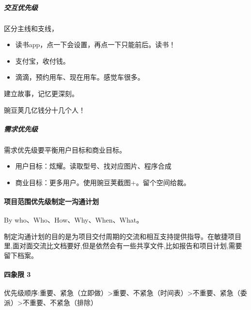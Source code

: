 \documentclass[letterpaper,11pt,english]{sphinxmanual}
\begin{document}
\subparagraph{交互优先级}
\label{\detokenize{chapter_skill/priority:id6}}
区分主线和支线，
\begin{itemize}
\item {} 
读书app，点一下会设置，再点一下只能前后。读书！

\item {} 
支付宝，收付钱。

\item {} 
滴滴，预约用车、现在用车。感觉车很多。

\end{itemize}

建立故事，记忆更深刻。

豌豆荚几亿钱分十几个人！


\subparagraph{需求优先级}
\label{\detokenize{chapter_skill/priority:id7}}
需求优先级要平衡用户目标和商业目标。
\begin{itemize}
\item {} 
用户目标：炫耀。读取型号、找对应图片、程序合成

\item {} 
商业目标：更多用户。使用豌豆荚截图+。留个空间给裁。

\end{itemize}


\paragraph{项目范围优先级制定一沟通计划}
\label{\detokenize{chapter_skill/priority:id8}}
By who、Who、How、Why、When、What。

制定沟通计划的目的是为项目交付周期的交流和相互支持提供指导。在敏捷项目里,面对面交流比文档要好,但是依然会有一些共享文件,比如报告和项目计划,需要留下档案。


\paragraph{四象限 3\sphinxfootnotemark[167]}
\label{\detokenize{chapter_skill/priority:id9}}%
\begin{footnotetext}[167]\sphinxAtStartFootnote
{}
%
\end{footnotetext}\ignorespaces 
优先级顺序:重要、紧急（立即做）>重要、不紧急（时间表）>不重要、紧急（委派）>不重要、不紧急（排除）
\end{document}
